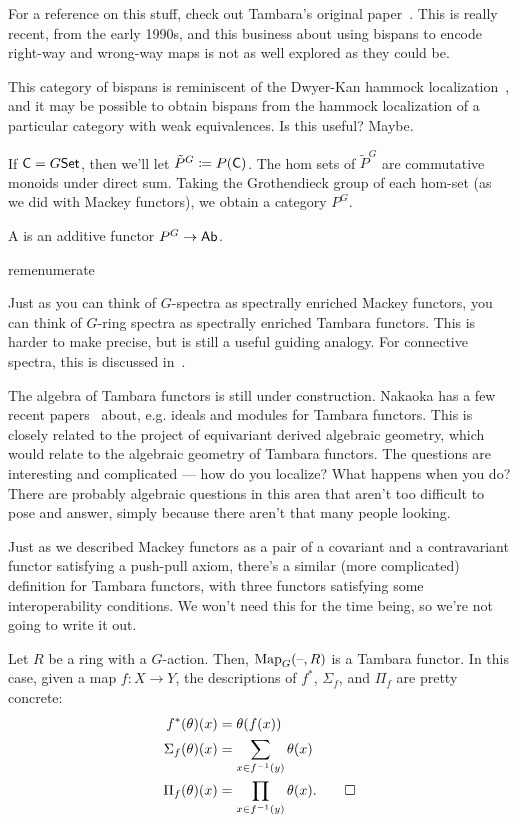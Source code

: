 For a reference on this stuff, check out Tambara's original paper~\cite{Tambara}. This is really recent, from the
early 1990s, and this business about using bispans to encode right-way and wrong-way maps is not as well explored
as they could be.
\begin{rem}
This category of bispans is reminiscent of the Dwyer-Kan hammock localization~\cite{Hammock}, and it may be
possible to obtain bispans from the hammock localization of a particular category with weak equivalences. Is this
useful? Maybe.
\end{rem}
If $\mathsf C = G\mathsf{Set}$, then we'll let $\tilde{P}^G\coloneqq P(\mathsf C)$. The hom sets of $\tilde{P}^G$ are commutative
monoids under direct sum. Taking the Grothendieck group of each hom-set (as we did with Mackey functors), we obtain
a category $P^G$.
\begin{defn}
A  is an additive functor $P^G\to\mathsf{Ab}$.
\end{defn}
\begin{comp}{rem}{enumerate}
	\item Just as you can think of $G$-spectra as spectrally enriched Mackey functors, you can think of $G$-ring
	spectra as spectrally enriched Tambara functors. This is harder to make precise, but is still a useful guiding
	analogy. For connective spectra, this is discussed in~\cite{Hoyer}.
	\item The algebra of Tambara functors is still under construction. Nakaoka has a few recent
	papers~\cite{NakaokaIdeals, NakaokaFractions, NakaokaSpectrum} about, e.g. ideals and modules for Tambara
	functors. This is closely related to the project of equivariant derived algebraic geometry, which would relate
	to the algebraic geometry of Tambara functors. The questions are interesting and complicated --- how do you
	localize? What happens when you do?  There are probably algebraic questions in this area that aren't too
	difficult to pose and answer, simply because there aren't that many people looking.
	\item Just as we described Mackey functors as a pair of a covariant and a contravariant functor satisfying a
	push-pull axiom, there's a similar (more complicated) definition for Tambara functors, with three functors
	satisfying some interoperability conditions. We won't need this for the time being, so we're not going to write
	it out. \qedhere
\end{comp}
\begin{exm}
Let $R$ be a ring with a $G$-action. Then, $\operatorname{Map}_G(\text{--},R)$ is a Tambara functor. In this case, given a map $f\colon
X\to Y$, the descriptions of $f^*$, $\Sigma_f$, and $\Pi_f$ are pretty concrete:
\begin{align*}
	f^*(\theta)(x) &= \theta(f(x))\\
	\Sigma_f(\theta)(x) &= \sum_{x\in f^{-1}(y)} \theta(x)\\
	\Pi_f(\theta)(x) &= \prod_{x\in f^{-1}(y)} \theta(x).\qedhere
\end{align*}
\end{exm}

